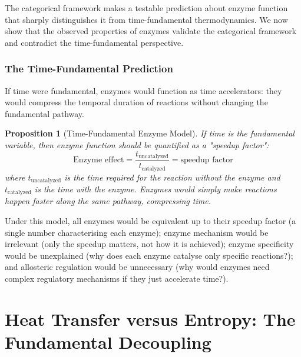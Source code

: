 \documentclass[12pt,a4paper]{article}
\newtheorem{proposition}[theorem]{Proposition}
\theoremstyle{definition}
\theoremstyle{remark}
\begin{document}
The categorical framework makes a testable prediction about enzyme function that sharply distinguishes it from time-fundamental thermodynamics. We now show that the observed properties of enzymes validate the categorical framework and contradict the time-fundamental perspective.

\subsubsection{The Time-Fundamental Prediction}

If time were fundamental, enzymes would function as time accelerators: they would compress the temporal duration of reactions without changing the fundamental pathway.

\begin{proposition}[Time-Fundamental Enzyme Model]
\label{prop:time_enzyme}
If time is the fundamental variable, then enzyme function should be quantified as a "speedup factor":
\begin{equation}
\text{Enzyme effect} = \frac{t_{\text{uncatalyzed}}}{t_{\text{catalyzed}}} = \text{speedup factor}
\label{eq:enzyme_speedup}
\end{equation}
where $t_{\text{uncatalyzed}}$ is the time required for the reaction without the enzyme and $t_{\text{catalyzed}}$ is the time with the enzyme. Enzymes would simply make reactions happen faster along the same pathway, compressing time.
\end{proposition}

Under this model, all enzymes would be equivalent up to their speedup factor (a single number characterising each enzyme); enzyme mechanism would be irrelevant (only the speedup matters, not how it is achieved); enzyme specificity would be unexplained (why does each enzyme catalyse only specific reactions?); and allosteric regulation would be unnecessary (why would enzymes need complex regulatory mechanisms if they just accelerate time?).

\section{Heat Transfer versus Entropy: The Fundamental Decoupling}
\label{sec:heat_transfer}
\end{document}
